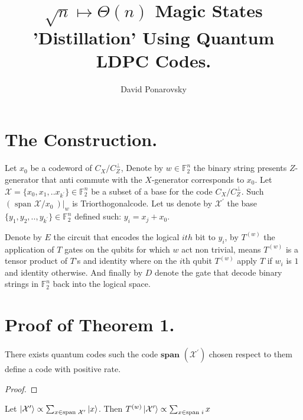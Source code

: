 \documentclass[manuscript,screen,review]{acmart}
\begin{document}

\title{ $\sqrt{n} \mapsto \Theta(n)$  Magic States 'Distillation' Using
Quantum LDPC Codes. }
\author{David Ponarovsky}
\maketitle

\newcommand*{\Mbas}{\mathcal{X}^\prime}
\newcommand*{\QQ}{C_{X}/C_{Z}^\perp }
\newcommand*{\trig}{Triorthogonal}

\section{The Construction.}

Let $x_{0}$ be a codeword of $\QQ$,  Denote by $w \in \mathbb{F}_{2}^{n}$
the binary string presents $Z$-generator that anti commute with the
$X$-generator corresponds to $x_{0}$. Let $\mathcal{X} = \{x_{0}, x_{1}, .. x_{k^\prime}\} \in \mathbb{F}_{2}^{n}$ be a
subset of a base for the code $\QQ$. Such $\left(\text{ span } \mathcal{X}/x_0 \ \right)|_{w}$ is \trig code.  
Let us denote by $\Mbas$ the base $\{ y_{1}, y_{2}, .., y_{k^\prime} \} \in
\mathbb{F}_{2}^{n}$ defined such: $ y_{i} = x_{j} + x_{0}$. 

Denote by $E$ the circuit that encodes the logical $ith$ bit to $y_{i}$, by $T^{(w)}$ the application of
$T$ gates on the qubits for which $w$ act non trivial, means $T^{(w)}$ is a
tensor product of $T$'s and identity where on the $i$th qubit $T^{(w)}$ apply
$T$ if $w_{i}$ is $1$ and identity otherwise. And finally by $D$ denote the gate that decode binary strings in $\mathbb{F}_{2}^{n}$ back into the logical space.


\section{Proof of Theorem 1.}

\begin{claim}
  There exists quantum codes such the code $\textbf{span }(\Mbas)$ chosen respect to them define a code with positive rate.   
\end{claim}
\begin{proof}
  
\end{proof}

\begin{claim}
  Let $\ket{\Mbas} \propto \sum_{x \in \text{span } \Mbas }{\ket{x}}$. Then $T^{(w)}\ket{\Mbas} \propto \sum_{x \in \text{span }i}{  x  }$
\end{claim}





%

\printbibliography
\end{document}
